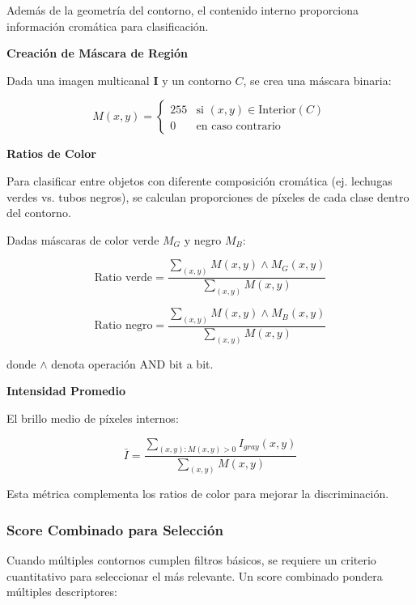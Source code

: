 Además de la geometría del contorno, el contenido interno proporciona información cromática para clasificación.

\textbf{Creación de Máscara de Región}

Dada una imagen multicanal $\mathbf{I}$ y un contorno $C$, se crea una máscara binaria:

\begin{equation}
M(x,y) = \begin{cases}
255 & \text{si } (x,y) \in \text{Interior}(C) \\
0 & \text{en caso contrario}
\end{cases}
\end{equation}

\textbf{Ratios de Color}

Para clasificar entre objetos con diferente composición cromática (ej. lechugas verdes vs. tubos negros), se calculan proporciones de píxeles de cada clase dentro del contorno.

Dadas máscaras de color verde $M_G$ y negro $M_B$:

\begin{equation}
\text{Ratio verde} = \frac{\sum_{(x,y)} M(x,y) \land M_G(x,y)}{\sum_{(x,y)} M(x,y)}
\end{equation}

\begin{equation}
\text{Ratio negro} = \frac{\sum_{(x,y)} M(x,y) \land M_B(x,y)}{\sum_{(x,y)} M(x,y)}
\end{equation}

donde $\land$ denota operación AND bit a bit.

\textbf{Intensidad Promedio}

El brillo medio de píxeles internos:

\begin{equation}
\bar{I} = \frac{\sum_{(x,y):M(x,y)>0} I_{gray}(x,y)}{\sum_{(x,y)} M(x,y)}
\end{equation}

Esta métrica complementa los ratios de color para mejorar la discriminación.

\subsubsection{Score Combinado para Selección}

Cuando múltiples contornos cumplen filtros básicos, se requiere un criterio cuantitativo para seleccionar el más relevante. Un score combinado pondera múltiples descriptores:


